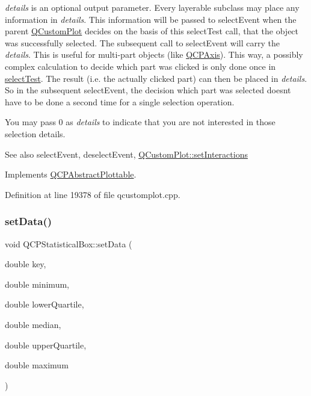 {\itshape details} is an optional output parameter. Every layerable subclass may place any information in {\itshape details}. This information will be passed to select\+Event when the parent \hyperlink{class_q_custom_plot}{Q\+Custom\+Plot} decides on the basis of this select\+Test call, that the object was successfully selected. The subsequent call to select\+Event will carry the {\itshape details}. This is useful for multi-\/part objects (like \hyperlink{class_q_c_p_axis}{Q\+C\+P\+Axis}). This way, a possibly complex calculation to decide which part was clicked is only done once in \hyperlink{class_q_c_p_statistical_box_a0153ac16326b94450afbca208e3f9961}{select\+Test}. The result (i.\+e. the actually clicked part) can then be placed in {\itshape details}. So in the subsequent select\+Event, the decision which part was selected doesn\textquotesingle{}t have to be done a second time for a single selection operation.

You may pass 0 as {\itshape details} to indicate that you are not interested in those selection details.

\begin{DoxySeeAlso}{See also}
select\+Event, deselect\+Event, \hyperlink{class_q_custom_plot_a5ee1e2f6ae27419deca53e75907c27e5}{Q\+Custom\+Plot\+::set\+Interactions} 
\end{DoxySeeAlso}


Implements \hyperlink{class_q_c_p_abstract_plottable_a38efe9641d972992a3d44204bc80ec1d}{Q\+C\+P\+Abstract\+Plottable}.



Definition at line 19378 of file qcustomplot.\+cpp.

\mbox{\label{class_q_c_p_statistical_box_adf50c57b635edb12470c0e4a986aff37}} 
\subsubsection{\texorpdfstring{set\+Data()}{setData()}}
{\footnotesize\ttfamily void Q\+C\+P\+Statistical\+Box\+::set\+Data (\begin{DoxyParamCaption}\item[{double}]{key,  }\item[{double}]{minimum,  }\item[{double}]{lower\+Quartile,  }\item[{double}]{median,  }\item[{double}]{upper\+Quartile,  }\item[{double}]{maximum }\end{DoxyParamCaption})}

